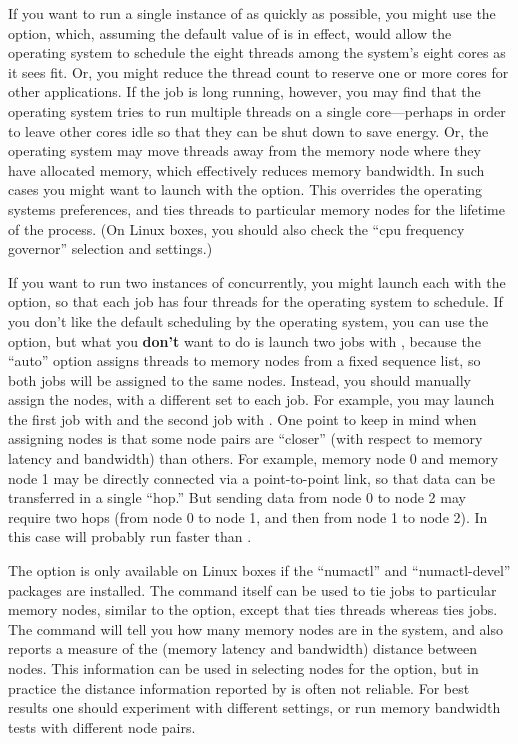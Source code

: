 If you want to run a single instance of  as quickly as
possible, you might use the  option, which, assuming the
default value of  is in effect, would allow the
operating system to schedule the eight threads among the system's eight
cores as it sees fit.  Or, you might reduce the thread count to reserve
one or more cores for other applications.  If the job is long running,
however, you may find that the operating system tries to run multiple
threads on a single core---perhaps in order to leave other cores idle so
that they can be shut down to save energy.  Or, the operating system may
move threads away from the memory node where they have allocated memory,
which effectively reduces memory bandwidth.  In such cases you might want
to launch  with the  option.  This
overrides the operating systems preferences, and ties threads to
particular memory nodes for the lifetime of the process.  (On Linux
boxes, you should also check the ``cpu frequency governor'' selection
and settings.)

If you want to run two instances of  concurrently, you might
launch each with the  option, so that each job has four
threads for the operating system to schedule.  If you don't like the
default scheduling by the operating system, you can use the
 option, but what you \textbf{don't} want to do is launch
two jobs with , because the ``auto'' option assigns
threads to memory nodes from a fixed sequence list, so both jobs will be
assigned to the same nodes.  Instead, you should manually assign the
nodes, with a different set to each job.  For example, you may launch
the first job with  and the second job with
.  One point to keep in mind when assigning nodes is
that some node pairs are ``closer'' (with respect to memory latency and
bandwidth) than others.  For example, memory node 0 and memory node 1
may be directly connected via a point-to-point link, so that data can be
transferred in a single ``hop.''  But sending data from node 0 to node 2
may require two hops (from node 0 to node 1, and then from node 1 to
node 2).  In this case  will probably run faster than
.

The  option is only available on Linux boxes if the
``numactl'' and ``numactl-devel'' packages are installed.  The
 command itself can be used to tie jobs to particular memory
nodes, similar to the  option, except that
 ties threads whereas  ties jobs.  The
 command will tell you how many memory nodes are
in the system, and also reports a measure of the (memory latency and
bandwidth) distance between nodes.  This information can be used in
selecting nodes for the  option, but in
practice the distance information reported by  is often not
reliable.  For best results one should experiment with different
settings, or run memory bandwidth tests with different node
pairs.


